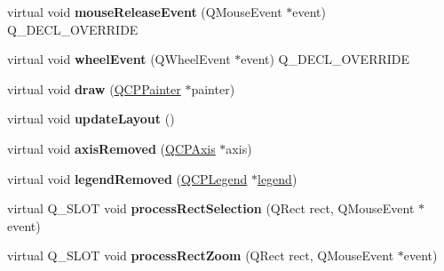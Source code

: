 \begin{DoxyCompactItemize}
\item 
virtual void {\bfseries mouse\+Release\+Event} (Q\+Mouse\+Event $\ast$event) Q\+\_\+\+D\+E\+C\+L\+\_\+\+O\+V\+E\+R\+R\+I\+DE\hypertarget{class_q_custom_plot_adc24846f52199e5a9bc35c387a6ce68d}{}\label{class_q_custom_plot_adc24846f52199e5a9bc35c387a6ce68d}

\item 
virtual void {\bfseries wheel\+Event} (Q\+Wheel\+Event $\ast$event) Q\+\_\+\+D\+E\+C\+L\+\_\+\+O\+V\+E\+R\+R\+I\+DE\hypertarget{class_q_custom_plot_a7848c9ac8be60bbd8fcea9b53be543c5}{}\label{class_q_custom_plot_a7848c9ac8be60bbd8fcea9b53be543c5}

\item 
virtual void {\bfseries draw} (\hyperlink{class_q_c_p_painter}{Q\+C\+P\+Painter} $\ast$painter)\hypertarget{class_q_custom_plot_ad7a7d878bf050f101a43008e7d8fdb52}{}\label{class_q_custom_plot_ad7a7d878bf050f101a43008e7d8fdb52}

\item 
virtual void {\bfseries update\+Layout} ()\hypertarget{class_q_custom_plot_a6e6693e2c249f65437382ffd93405e04}{}\label{class_q_custom_plot_a6e6693e2c249f65437382ffd93405e04}

\item 
virtual void {\bfseries axis\+Removed} (\hyperlink{class_q_c_p_axis}{Q\+C\+P\+Axis} $\ast$axis)\hypertarget{class_q_custom_plot_a8b46607021c463c94709d3504951cb47}{}\label{class_q_custom_plot_a8b46607021c463c94709d3504951cb47}

\item 
virtual void {\bfseries legend\+Removed} (\hyperlink{class_q_c_p_legend}{Q\+C\+P\+Legend} $\ast$\hyperlink{class_q_custom_plot_a4eadcd237dc6a09938b68b16877fa6af}{legend})\hypertarget{class_q_custom_plot_a9d173454555021c9ffd4f675c4d9037a}{}\label{class_q_custom_plot_a9d173454555021c9ffd4f675c4d9037a}

\item 
virtual Q\+\_\+\+S\+L\+OT void {\bfseries process\+Rect\+Selection} (Q\+Rect rect, Q\+Mouse\+Event $\ast$event)\hypertarget{class_q_custom_plot_ac10849411e1d0e858ea7f29c8ade364c}{}\label{class_q_custom_plot_ac10849411e1d0e858ea7f29c8ade364c}

\item 
virtual Q\+\_\+\+S\+L\+OT void {\bfseries process\+Rect\+Zoom} (Q\+Rect rect, Q\+Mouse\+Event $\ast$event)\hypertarget{class_q_custom_plot_a5508a207dcc279f316142f96d984bba3}{}\label{class_q_custom_plot_a5508a207dcc279f316142f96d984bba3}


\end{DoxyCompactItemize}
